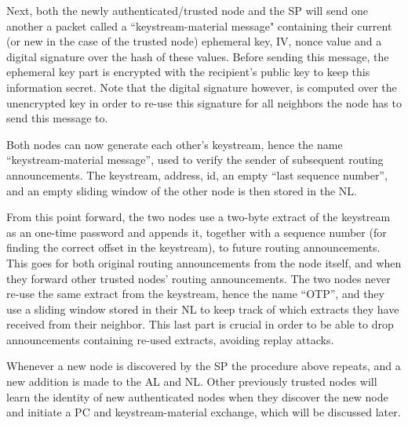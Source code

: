 Next, both the newly authenticated/trusted node and the \ac{SP} will send one
another a packet called a ``keystream-material message" containing their
current (or new in the case of the trusted node) ephemeral key, \ac{IV}, nonce
value and a digital signature over the hash of these values. Before sending
this message, the ephemeral key part is encrypted with the recipient's public
key to keep this information secret. Note that the digital signature however,
is computed over the unencrypted key in order to re-use this signature for all
neighbors the node has to send this message to.

Both nodes can now generate each other's keystream, hence the name
``keystream-material message'', used to verify the sender of subsequent routing
announcements. The keystream, address, id, an empty ``last sequence number'',
and an empty sliding window of the other node is then stored in the \ac{NL}.


From this point forward, the two nodes use a two-byte extract of the keystream
as an one-time password and appends it, together with a sequence number (for
finding the correct offset in the keystream), to future routing announcements.
This goes for both original routing announcements from the node itself, and when
they forward other trusted nodes' routing announcements. The two nodes never
re-use the same extract from the keystream, hence the name ``\acf{OTP}'', and
they use a sliding window stored in their \ac{NL} to keep track of which
extracts they have received from their neighbor. This last part is crucial in
order to be able to drop announcements containing re-used extracts, avoiding
replay attacks. 

Whenever a new node is discovered by the \ac{SP} the procedure above repeats,
and a new addition is made to the \ac{AL} and \ac{NL}. Other previously
trusted nodes will learn the identity of new authenticated nodes when they
discover the new node and initiate a PC and keystream-material exchange, which
will be discussed later.

